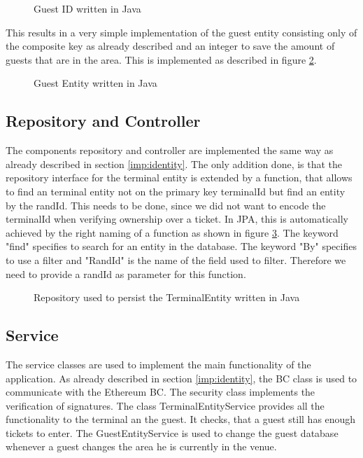 \begin{figure}[H]
    
    \caption{Guest ID written in Java}
    \label{code:GuestID}
\end{figure}


This results in a very simple implementation of the guest entity consisting only of the composite key as already described and an integer to save the amount of guests that are in the area. This is implemented as described in figure \ref{code:GuestEntity}.

\begin{figure}[H]
    
    \caption{Guest Entity written in Java}
    \label{code:GuestEntity}
\end{figure}

\subsection{Repository and Controller}

The components repository and controller are implemented the same way as already described in section \ref{imp:identity}. The only addition done, is that the repository interface for the terminal entity is extended by a function, that allows to find an terminal entity not on the primary key terminalId but find an entity by the randId. This needs to be done, since we did not want to encode the terminalId when verifying ownership over a ticket. In JPA, this is automatically achieved by the right naming of a function as shown in figure \ref{code:repo:terminal}. The keyword "find" specifies to search for an entity in the database. The keyword "By" specifies to use a filter and "RandId" is the name of the field used to filter. Therefore we need to provide a randId as parameter for this function.  

\begin{figure}[H]
    
    \caption{Repository used to persist the TerminalEntity written in Java}
    \label{code:repo:terminal}
\end{figure}

\subsection{Service}

The service classes are used to implement the main functionality of the application. As already described in section \ref{imp:identity}, the BC class is used to communicate with the Ethereum BC. The security class implements the verification of signatures.
The class TerminalEntityService provides all the functionality to the terminal an the guest. It checks, that a guest still has enough tickets to enter. 
The GuestEntityService is used to change the guest database whenever a guest changes the area he is currently in the venue. 
